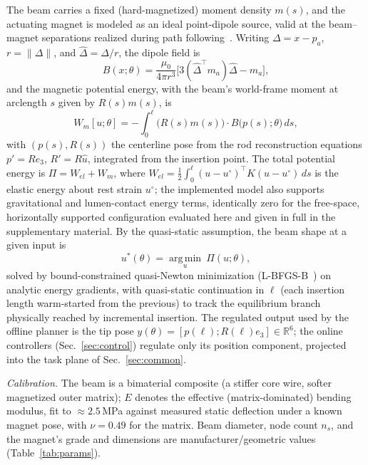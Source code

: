 \documentclass[journal]{IEEEtran}
\begin{document}
The beam carries a fixed (hard-magnetized) moment density $m(s)$, and the
actuating magnet is modeled as an ideal point-dipole source, valid at the
beam--magnet separations realized during path
following~\cite{fu2023magnetic,kratchman2017guiding}.
Writing $\Delta=x-p_a$, $r=\lVert\Delta\rVert$, and
$\hat\Delta=\Delta/r$, the dipole field is
\begin{equation}
B(x;\theta) = \frac{\mu_0}{4\pi r^{3}}
\Big[3(\hat\Delta^{\top}m_a)\hat\Delta - m_a\Big],
\label{eq:dipole-field}
\end{equation}
and the magnetic potential energy, with the beam's world-frame moment at
arclength $s$ given by $R(s)m(s)$, is
\begin{equation}
W_m[u;\theta] = -\int_0^{\ell} \big(R(s)m(s)\big)\cdot
B\big(p(s);\theta\big)\,ds,
\label{eq:magnetic-energy}
\end{equation}
with $(p(s),R(s))$ the centerline pose from the rod reconstruction
equations $p'=Re_3$, $R'=R\hat u$, integrated from the insertion point.
The total potential energy is $\Pi=W_{el}+W_m$, where
$W_{el}=\tfrac12\int_0^\ell(u-u^\circ)^\top K(u-u^\circ)\,ds$ is the
elastic energy about rest strain $u^\circ$; the implemented model also
supports gravitational and lumen-contact energy terms, identically zero
for the free-space, horizontally supported configuration evaluated here
and given in full in the supplementary material. By the quasi-static
assumption, the beam shape at a given input is
\begin{equation}
u^{*}(\theta) = \operatorname*{arg\,min}_{u}\ \Pi(u;\theta),
\label{eq:equilibrium}
\end{equation}
solved by bound-constrained quasi-Newton minimization
(L-BFGS-B~\cite{byrd1995lbfgsb}) on analytic energy gradients, with
quasi-static continuation in $\ell$ (each insertion length warm-started
from the previous) to track the equilibrium branch physically reached by
incremental insertion. The regulated output used by the offline planner
is the tip pose $y(\theta)=[p(\ell);R(\ell)e_3]\in\mathbb{R}^6$; the
online controllers (Sec.~\ref{sec:control}) regulate only its position
component, projected into the task plane of Sec.~\ref{sec:common}.

\emph{Calibration.} The beam is a bimaterial composite (a stiffer core
wire, softer magnetized outer matrix); $E$ denotes the effective
(matrix-dominated) bending modulus, fit to $\approx2.5$\,MPa against
measured static deflection under a known magnet pose, with $\nu=0.49$ for
the matrix. Beam diameter, node count $n_s$, and the magnet's grade and
dimensions are manufacturer/geometric values (Table~\ref{tab:params}).
\end{document}
